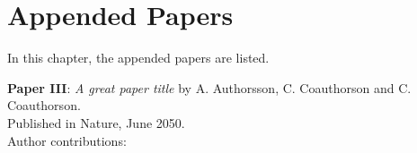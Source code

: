 \chapter{Appended Papers\label{chap:6}}

In this chapter, the appended papers are listed.

\noindent
\textbf{Paper III}: \emph{A great paper title} by A. Authorsson, C. Coauthorson and C. Coauthorson.\vspace{4pt}\\
Published in Nature, June 2050.\vspace{4pt}\\
\noindent Author contributions:\\\vspace{5pt}
